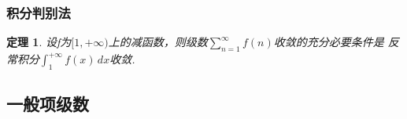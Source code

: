 \documentclass[12pt, UTF8, AutoFakeBold]{ctexart} %
\newtheorem{theorem}{定理}[section]
\begin{document}
\subsubsection{积分判别法}
\begin{theorem}
    设f为$[1,+\infty)$上的减函数，则级数$\sum\limits_{n=1}^{\infty}f(n)$收敛的充分必要条件是
    反常积分$\int_{1}^{+\infty}f(x)\, dx$收敛.
\end{theorem}

\subsection{一般项级数}
\end{document}
